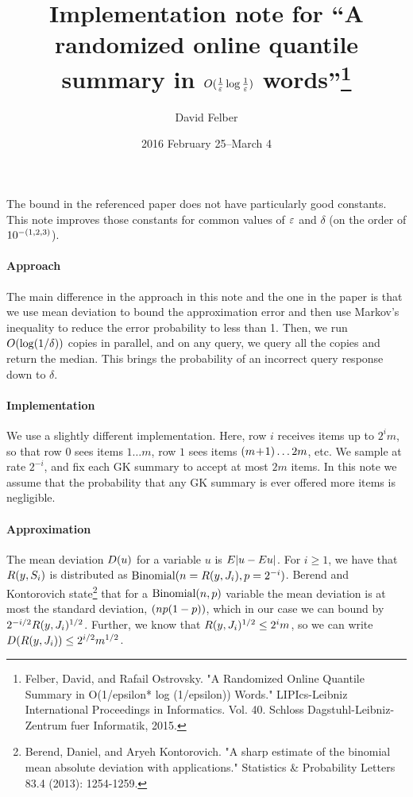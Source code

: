 \documentclass{article}
\title{Implementation note for ``A randomized online quantile summary in
  $O(\frac{1}{\varepsilon} \log \frac{1}{\varepsilon})$ words''\footnote{Felber, David, and
    Rafail Ostrovsky. "A Randomized Online Quantile Summary in O(1/epsilon* log
    (1/epsilon)) Words." LIPIcs-Leibniz International Proceedings in
    Informatics. Vol. 40. Schloss Dagstuhl-Leibniz-Zentrum fuer Informatik,
    2015.}}
\author{David Felber}
\date{2016 February 25--March 4}
\theoremstyle{plain}
\newcommand{\D}[1]{D\p{#1}}
\newcommand{\rank}[2]{R\p{#1,#2}}
\begin{document}
\maketitle


The bound in the referenced paper does not have particularly good constants.
This note improves those constants for common values of $\varepsilon$ and $\delta$ (on
the order of $10^{-(1,2,3)}$).

\paragraph{Approach}
The main difference in the approach in this note and the one in the paper is
that we use mean deviation to bound the approximation error and then use
Markov's inequality to reduce the error probability to less than 1. Then, we run
$O(\log(1/\delta))$ copies in parallel, and on any query, we query all the
copies and return the median. This brings the probability of an incorrect query
response down to $\delta$.

\paragraph{Implementation}
We use a slightly different implementation. Here, row $i$ receives items up to
$2^i m$, so that row $0$ sees items $1 \ldots m$, row $1$ sees items $(m \!+\!
  1) \ldots 2m$, etc. We sample at rate $2^{-i}$, and fix each GK summary to
accept at most $2m$ items. In this note we assume that the probability that any
GK summary is ever offered more items is negligible.

\paragraph{Approximation}
The mean deviation $\D{u}$ for a variable $u$ is $E|u - Eu|$. For $i \ge 1$,
we have that $\rank{y}{S_i}$ is distributed as $\text{Binomial}\p{n =
  \rank{y}{J_i}, p = 2^{-i}}$. Berend and Kontorovich state\footnote{Berend,
  Daniel, and Aryeh Kontorovich. "A sharp estimate of the binomial mean absolute
  deviation with applications." Statistics \& Probability Letters 83.4 (2013):
  1254-1259.} that for a $\text{Binomial}(n,p)$ variable the mean deviation is
at most the standard deviation, $(np(1-p))$, which in our case we can bound
by $2^{-i/2} \rank{y}{J_i}^{1/2}$. Further, we know that $\rank{y}{J_i}^{1/2}
\le 2^i m$, so we can write $\D{\rank{y}{J_i}} \le 2^{i/2} m^{1/2}$.
\end{document}
